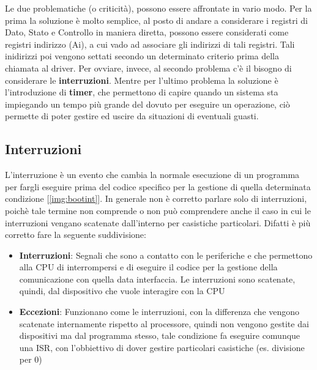 Le due problematiche (o criticità), possono essere affrontate in vario modo. Per la prima la soluzione è molto semplice, al posto di andare a considerare i registri di Dato, Stato e Controllo in maniera diretta, possono essere considerati come registri indirizzo (Ai), a cui vado ad associare gli indirizzi di tali registri. Tali inidirizzi poi vengono settati secondo un determinato criterio prima della chiamata al driver.
Per ovviare, invece, al secondo problema c'è il bisogno di considerare le \textbf{interruzioni}. Mentre per l'ultimo problema la soluzione è l'introduzione di \textbf{timer}, che permettono di capire quando un sistema sta impiegando un tempo più grande del dovuto per eseguire un operazione, ciò permette di poter gestire ed uscire da situazioni di eventuali guasti.

\subsection{Interruzioni}
L'interruzione è un evento che cambia la normale esecuzione di un programma per fargli eseguire prima del codice specifico per la gestione di quella determinata condizione [\ref{img:bootint}]. In generale non è corretto parlare solo di interruzioni, poichè tale termine non comprende o non può comprendere anche il caso in cui le interruzioni vengano scatenate dall'interno per casistiche particolari. Difatti è più corretto fare la seguente suddivisione:
\begin{itemize}
    \item \textbf{Interruzioni}: Segnali che sono a contatto con le periferiche e che permettono alla CPU di interrompersi e di eseguire il codice per la gestione della comunicazione con quella data interfaccia. Le interruzioni sono scatenate, quindi, dal dispositivo che vuole interagire con la CPU
    \item \textbf{Eccezioni}: Funzionano come le interruzioni, con la differenza che vengono scatenate internamente rispetto al processore, quindi non vengono gestite dai dispositivi ma dal programma stesso, tale condizione fa eseguire comunque una ISR, con l'obbiettivo di dover gestire particolari casistiche (es. divisione per 0)
\end{itemize}

